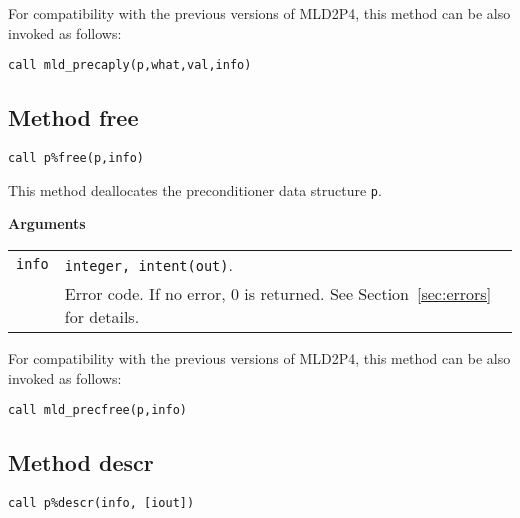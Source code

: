 \baselineskip
For compatibility with the previous versions of MLD2P4, this method can be also invoked
as follows:

\begin{center}
\verb|call mld_precaply(p,what,val,info)|
\end{center}

\clearpage

\subsection{Method free\label{sec:precfree}}

\begin{center}
\verb|call p%free(p,info)|\\
\end{center}

\noindent
This method deallocates the preconditioner data structure \verb|p|.

{\baselineskip\noindent\large\bfseries Arguments} \smallskip

\begin{tabular}{p{1.2cm}p{10.5cm}}
\verb|info|   & \verb|integer, intent(out)|.\\
              & Error code. If no error, 0 is returned. See Section~\ref{sec:errors} for details.\\
\end{tabular}

\baselineskip
For compatibility with the previous versions of MLD2P4, this method can be also invoked
as follows:

\begin{center}
\verb|call mld_precfree(p,info)|
\end{center}


\clearpage

\subsection{Method descr\label{sec:precdescr}}

\begin{center}
\verb|call p%descr(info, [iout])|\\
\end{center}

